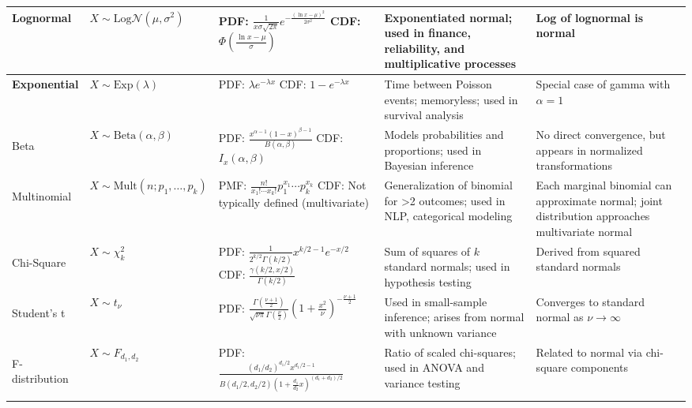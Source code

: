 \documentclass[10pt]{article}
\begin{document}
\begin{longtable}{|>{\bfseries}m{2cm}|m{2.8cm}|p{4.5cm}|p{5.2cm}|p{4.5cm}|}
  Lognormal & $X \sim \mathrm{Log}\mathcal{N}(\mu, \sigma^2)$ &
  PDF: $\frac{1}{x\sigma\sqrt{2\pi}} e^{-\frac{(\ln x -
  \mu)^2}{2\sigma^2}}$ \newline
  CDF: $\Phi\left(\frac{\ln x - \mu}{\sigma}\right)$ &
  Exponentiated normal; used in finance, reliability, and
  multiplicative processes &
  Log of lognormal is normal \\
  \hline

  Exponential & $X \sim \mathrm{Exp}(\lambda)$ &
  PDF: $\lambda e^{-\lambda x}$ \newline
  CDF: $1 - e^{-\lambda x}$ &
  Time between Poisson events; memoryless; used in survival analysis &
  Special case of gamma with $\alpha = 1$ \\
  \hline

  Beta & $X \sim \mathrm{Beta}(\alpha, \beta)$ &
  PDF: $\frac{x^{\alpha - 1}(1 - x)^{\beta - 1}}{B(\alpha, \beta)}$ \newline
  CDF: $I_x(\alpha, \beta)$ &
  Models probabilities and proportions; used in Bayesian inference &
  No direct convergence, but appears in normalized transformations \\
  \hline

		Multinomial & $X \sim \mathrm{Mult}(n; p_1, \dots, p_k)$ &
  PMF: $\frac{n!}{x_1! \cdots x_k!} p_1^{x_1} \cdots p_k^{x_k}$ \newline
  CDF: Not typically defined (multivariate) &
  Generalization of binomial for >2 outcomes; used in NLP, categorical modeling &
		Each marginal binomial can approximate normal; joint distribution approaches
		multivariate normal \\
  \hline

  Chi-Square & $X \sim \chi^2_k$ &
  PDF: $\frac{1}{2^{k/2} \Gamma(k/2)} x^{k/2 - 1} e^{-x/2}$ \newline
  CDF: $\frac{\gamma(k/2, x/2)}{\Gamma(k/2)}$ &
  Sum of squares of $k$ standard normals; used in hypothesis testing &
  Derived from squared standard normals \\
  \hline

  Student's t & $X \sim t_\nu$ &
  PDF: $\frac{\Gamma\left(\frac{\nu+1}{2}\right)}{\sqrt{\nu\pi}
  \Gamma\left(\frac{\nu}{2}\right)} \left(1 +
  \frac{x^2}{\nu}\right)^{-\frac{\nu+1}{2}}$ &
  Used in small-sample inference; arises from normal with unknown variance &
  Converges to standard normal as $\nu \to \infty$ \\
  \hline

  F-distribution & $X \sim F_{d_1, d_2}$ &
  PDF: $\frac{(d_1/d_2)^{d_1/2} x^{d_1/2 - 1}}{B(d_1/2, d_2/2)(1 +
  \frac{d_1}{d_2}x)^{(d_1 + d_2)/2}}$ &
  Ratio of scaled chi-squares; used in ANOVA and variance testing &
  Related to normal via chi-square components \\
  \hline


\end{longtable}
\end{document}
